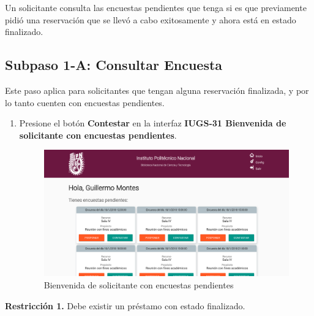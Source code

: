 Un solicitante consulta las encuestas pendientes que tenga si es que previamente
pidió una reservación que se llevó a cabo exitosamente y ahora está en estado finalizado.

\subsection{Subpaso 1-A: Consultar Encuesta}
Este paso aplica para solicitantes que tengan alguna reservación finalizada, y por lo tanto cuenten
con encuestas pendientes.
\begin{enumerate}
	\item Presione el botón \textbf{Contestar} en la interfaz
    \textbf{IUGS-31 Bienvenida de solicitante con encuestas pendientes}.
    \begin{figure}[hbtp]
	\includegraphics[scale=0.3]{images/Interfaz/IUGS-31 Bienvenida de solicitante con encuestas pendientes.png}
	\caption{Bienvenida de solicitante con encuestas pendientes}
	\end{figure}
\end{enumerate}

\textbf{Restricción 1.} Debe existir un préstamo con estado finalizado.
